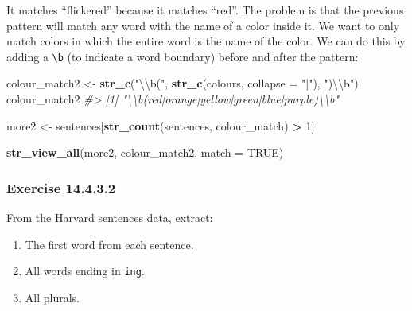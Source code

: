 \documentclass[]{book}
\newenvironment{Shaded}{\begin{snugshade}}{\end{snugshade}}
\newcommand{\CharTok}[1]{\textcolor[rgb]{0.31,0.60,0.02}{#1}}
\newcommand{\CommentTok}[1]{\textcolor[rgb]{0.56,0.35,0.01}{\textit{#1}}}
\newcommand{\DataTypeTok}[1]{\textcolor[rgb]{0.13,0.29,0.53}{#1}}
\newcommand{\DecValTok}[1]{\textcolor[rgb]{0.00,0.00,0.81}{#1}}
\newcommand{\KeywordTok}[1]{\textcolor[rgb]{0.13,0.29,0.53}{\textbf{#1}}}
\newcommand{\NormalTok}[1]{#1}
\newcommand{\OperatorTok}[1]{\textcolor[rgb]{0.81,0.36,0.00}{\textbf{#1}}}
\newcommand{\OtherTok}[1]{\textcolor[rgb]{0.56,0.35,0.01}{#1}}
\newcommand{\StringTok}[1]{\textcolor[rgb]{0.31,0.60,0.02}{#1}}
\providecommand{\tightlist}{%
  \setlength{\itemsep}{0pt}\setlength{\parskip}{0pt}}
\theoremstyle{plain}
\theoremstyle{remark}
\theoremstyle{definition}
\theoremstyle{definition}
\theoremstyle{definition}
\theoremstyle{remark}
\begin{document}
It matches ``flickered'' because it matches ``red''. The problem is that
the previous pattern will match any word with the name of a color inside
it. We want to only match colors in which the entire word is the name of
the color. We can do this by adding a \texttt{\textbackslash{}b} (to
indicate a word boundary) before and after the pattern:

\begin{Shaded}
\begin{Highlighting}[]
\NormalTok{colour_match2 <-}\StringTok{ }\KeywordTok{str_c}\NormalTok{(}\StringTok{"}\CharTok{\textbackslash{}\textbackslash{}}\StringTok{b("}\NormalTok{, }\KeywordTok{str_c}\NormalTok{(colours, }\DataTypeTok{collapse =} \StringTok{"|"}\NormalTok{), }\StringTok{")}\CharTok{\textbackslash{}\textbackslash{}}\StringTok{b"}\NormalTok{)}
\NormalTok{colour_match2}
\CommentTok{#> [1] "\textbackslash{}\textbackslash{}b(red|orange|yellow|green|blue|purple)\textbackslash{}\textbackslash{}b"}
\end{Highlighting}
\end{Shaded}

\begin{Shaded}
\begin{Highlighting}[]
\NormalTok{more2 <-}\StringTok{ }\NormalTok{sentences[}\KeywordTok{str_count}\NormalTok{(sentences, colour_match) }\OperatorTok{>}\StringTok{ }\DecValTok{1}\NormalTok{]}
\end{Highlighting}
\end{Shaded}

\begin{Shaded}
\begin{Highlighting}[]
\KeywordTok{str_view_all}\NormalTok{(more2, colour_match2, }\DataTypeTok{match =} \OtherTok{TRUE}\NormalTok{)}
\end{Highlighting}
\end{Shaded}

\hypertarget{exercise-14.4.3.2}{%
\subsubsection*{\texorpdfstring{Exercise
{14.4.3.2}}{Exercise 14.4.3.2}}\label{exercise-14.4.3.2}}

From the Harvard sentences data, extract:

\begin{enumerate}
\def\labelenumi{\arabic{enumi}.}
\tightlist
\item
  The first word from each sentence.
\item
  All words ending in \texttt{ing}.
\item
  All plurals.
\end{enumerate}
\end{document}
